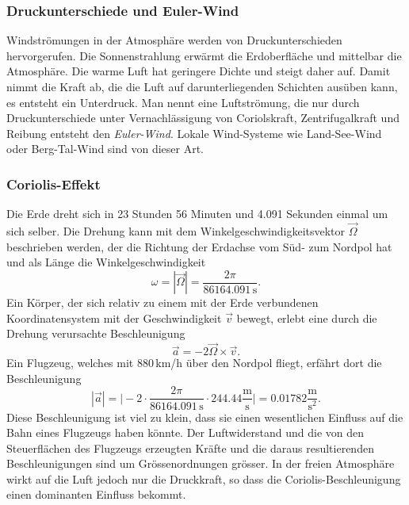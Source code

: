 \subsubsection{Druckunterschiede und Euler-Wind}
Windströmungen in der Atmosphäre werden von Druckunterschieden
hervorgerufen.
Die Sonnenstrahlung erwärmt die Erdoberfläche und mittelbar die
Atmosphäre.
Die warme Luft hat geringere Dichte und steigt daher auf.
Damit nimmt die Kraft ab, die die Luft auf darunterliegenden
Schichten ausüben kann, es entsteht ein Unterdruck.
Man nennt eine Luftströmung, die nur durch Druckunterschiede
unter Vernachlässigung von Coriolskraft, Zentrifugalkraft und
Reibung entsteht den {\em Euler-Wind}.
Lokale Wind-Systeme wie Land-See-Wind oder Berg-Tal-Wind sind von
dieser Art.

\subsubsection{Coriolis-Effekt}
%
%
Die Erde dreht sich in 23 Stunden 56 Minuten und 4.091 Sekunden
einmal um sich selber.
Die Drehung kann mit dem Winkelgeschwindigkeitsvektor
$\vec{\Omega}$
beschrieben werden, der die Richtung der Erdachse vom Süd- zum Nordpol
hat und als Länge die Winkelgeschwindigkeit
\[
\omega
=
|\vec{\Omega}|
=
\frac{2\pi}{86164.091\,\text{s}}.
\]
Ein Körper, der sich relativ zu einem mit der Erde verbundenen
Koordinatensystem mit der Geschwindigkeit $\vec{v}$ bewegt,
erlebt eine durch die Drehung verursachte Beschleunigung
\[
\vec{a} = -2\vec{\Omega}\times\vec{v}.
\]
Ein Flugzeug, welches mit 880\,km/h über den Nordpol fliegt,
erfährt dort die Beschleunigung 
\[
|\vec{a}|
=
\biggl|
-2
\cdot
\frac{2\pi}{86164.091\,\text{s}}
\cdot
244.44\frac{\text{m}}{\text{s}}
\biggr|
=
0.01782\frac{\text{m}}{\text{s}^2}.
\]
Diese Beschleunigung ist viel zu klein, dass sie einen wesentlichen
Einfluss auf die Bahn eines Flugzeugs haben könnte.
Der Luftwiderstand und die von den Steuerflächen des Flugzeugs erzeugten
Kräfte und die daraus resultierenden Beschleunigungen sind
um Grössenordnungen grösser.
In der freien Atmosphäre wirkt auf die Luft jedoch nur die Druckkraft,
so dass die Coriolis-Beschleunigung einen dominanten Einfluss bekommt.

